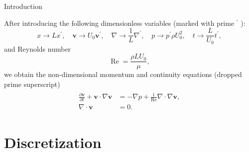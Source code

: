 \documentclass{beamer}
\begin{document}
  \begin{frame}{Introduction}
  
  After introducing the following dimensionless variables (marked with prime ${ }^{\prime}$ ):
\begin{equation*}
	x\to Lx^{\prime},  \quad 
	\boldsymbol{v}\to U_0\boldsymbol{v}^{\prime}, \quad 
	\nabla\to \frac{1}{L}\nabla^{\prime}, \quad 
	p\to p^{\prime} \rho U_0^2, \quad 
	t\to \frac{L}{U_0}t^{\prime},
\end{equation*}
and Reynolds number 
\begin{equation*}
\operatorname{Re}=\frac{\rho L U_0}{\mu},
\end{equation*}
we obtain the non-dimensional momentum and continuity equations (dropped prime superscript)
	\begin{align}\label{eqs:NSE-nondim}
	\begin{split}
		\frac{\partial \boldsymbol{v}}{\partial t} + \boldsymbol{v} \cdot \nabla \boldsymbol{v} &= -\nabla p + \frac{1}{\operatorname{Re}} \nabla \cdot \nabla \boldsymbol{v},\\
		\nabla \cdot\boldsymbol{v}&=0.
	\end{split}
	\end{align}
  \end{frame}


  
  
  

  
	\section{Discretization}
	
\end{document}
